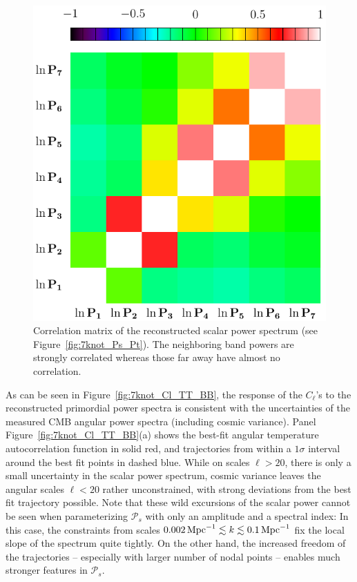 \documentclass[a4paper,11pt]{article}
\def\mpc{{\rm\,Mpc}}
\def\mpc{{\rm\,Mpc}}
\newcommand{\pscalar}{{\mathcal{P}_s}}
\def\goodkrange{0.002\mpc^{-1}\lesssim k\lesssim 0.1\mpc^{-1}}
\begin{document}
\begin{figure}
  \includegraphics[width=0.9\linewidth]{p7cubicspline_correlation} 
  \caption{Correlation matrix of the reconstructed scalar power
  spectrum (see Figure~\ref{fig:7knot_Ps_Pt}).  The neighboring band
  powers are strongly correlated whereas those far away have almost no
  correlation.}  
  \label{fig:band_band_correlations}
\end{figure}

As can be seen in Figure~\ref{fig:7knot_Cl_TT_BB}, the response of the
$C_\ell$'s to the reconstructed primordial power spectra is consistent
with the uncertainties of the measured CMB angular power spectra
(including cosmic variance). Panel Figure~\ref{fig:7knot_Cl_TT_BB}(a)
shows the best-fit angular temperature autocorrelation function in
solid red, and trajectories from within a $1\sigma$ interval around
the best fit points in dashed blue. While on scales $\ell>20$, there
is only a small uncertainty in the scalar power spectrum, cosmic
variance leaves the angular scales $\ell<20$ rather unconstrained,
with strong deviations from the best fit trajectory possible. Note
that these wild excursions of the scalar power cannot be seen when
parameterizing $\pscalar$ with only an amplitude and a spectral index:
In this case, the constraints from scales $\goodkrange$ fix the local
slope of the spectrum quite tightly. On the other hand, the increased
freedom of the trajectories -- especially with larger number of nodal
points -- enables much stronger features in $\pscalar$.
\end{document}
